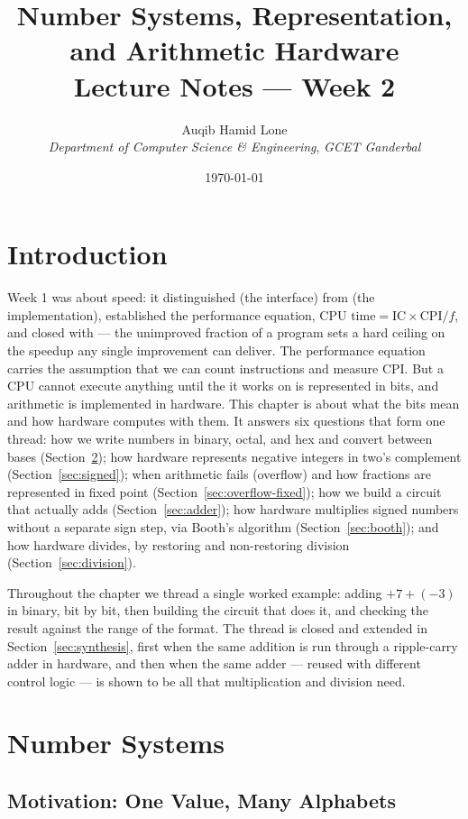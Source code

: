 \documentclass[11pt]{article}
\title{Number Systems, Representation, and Arithmetic Hardware\\\large Lecture Notes --- Week 2}
\author{Auqib Hamid Lone\\[0.3em]
  \emph{Department of Computer Science \& Engineering}, \emph{GCET Ganderbal}}
\date{\today}
\begin{document}
\maketitle

\section{Introduction}

Week 1 was about speed: it distinguished  (the interface) from  (the implementation), established the performance equation, $\text{CPU time} = \text{IC} \times \text{CPI} / f$, and closed with  --- the unimproved fraction of a program sets a hard ceiling on the speedup any single improvement can deliver. The performance equation carries the assumption that we can count instructions and measure CPI. But a CPU cannot execute anything until the  it works on is represented in bits, and arithmetic is implemented in hardware. This chapter is about what the bits mean and how hardware computes with them. It answers six questions that form one thread: how we write numbers in binary, octal, and hex and convert between bases (Section~\ref{sec:number-systems}); how hardware represents negative integers in two's complement (Section~\ref{sec:signed}); when arithmetic fails (overflow) and how fractions are represented in fixed point (Section~\ref{sec:overflow-fixed}); how we build a circuit that actually adds (Section~\ref{sec:adder}); how hardware multiplies signed numbers without a separate sign step, via Booth's algorithm (Section~\ref{sec:booth}); and how hardware divides, by restoring and non-restoring division (Section~\ref{sec:division}).

Throughout the chapter we thread a single worked example: adding $+7 + (-3)$ in binary, bit by bit, then building the circuit that does it, and checking the result against the range of the format. The thread is closed and extended in Section~\ref{sec:synthesis}, first when the same addition is run through a ripple-carry adder in hardware, and then when the same adder --- reused with different control logic --- is shown to be all that multiplication and division need.

\section{Number Systems}
\label{sec:number-systems}

\subsection{Motivation: One Value, Many Alphabets}
\end{document}
